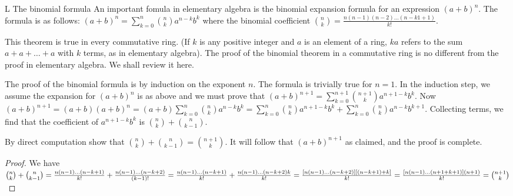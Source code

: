 \begin{exercise}{L The binomial formula}
An important fomula in elementary algebra is the binomial expansion formula for an expression $(a+b)^{n}$. The formula is as follows: $(a+b)^{n}=\sum_{k=0}^{n}{n\choose k}a^{n-k}b^{k}$ where the binomial coefficient ${n\choose k}=\frac{n(n-1)(n-2)\dots(n-k1+1)}{k!}$.

This theorem is true in every commutative ring. (If $k$ is any positive integer and $a$ is an element of a ring, $ka$ refers to the sum $a+a+\dots+a$ with $k$ terms, as in elementary algebra). The proof of the binomial theorem in a commutative ring is no different from the proof in elementary algebra. We shall review it here. 

The proof of the binomial formula is by induction on the exponent $n$. The formula is trivially true for $n=1$. In the induction step, we assume the expansion for $(a+b)^{n}$ is as above and we must prove that $(a+b)^{n+1}=\sum_{k=0}^{n+1}{n+1\choose k}a^{n+1-k}b^{k}$. Now $(a+b)^{n+1}= (a+b)(a+b)^{n}= (a+b)\sum_{k=0}^{n}{n\choose k}a^{n-k}b^{k}= \sum_{k=0}^{n}{n\choose k}a^{n+1-k}b^{k}+\sum_{k=0}^{n}{n\choose k}a^{n-k}b^{k+1}$. Collecting terms, we find that the coefficient of $a^{n+1-k}b^{k}$ is ${n\choose k}+{n\choose k-1}$.

By direct computation show that ${n\choose k}+{n\choose k-1}= {n+1\choose k}$. It will follow that $(a+b)^{n+1}$ as claimed, and the proof is complete.
\end{exercise}
\begin{proof}
 We have ${n\choose k}+{n\choose k-1} =\frac{n(n-1)\dots(n-k+1)}{k!} + \frac{n(n-1)\dots(n-k+2)}{(k-1)!} \\
 =\frac{n(n-1)\dots(n-k+1)}{k!} + \frac{n(n-1)\dots(n-k+2)k}{k!} =\frac{[n(n-1)\dots(n-k+2)][(n-k+1)+k]}{k!} 
 \\=\frac{[n(n-1)\dots(n+1+k+1)](n+1)}{k!} = {n+1\choose k}$ 
\end{proof}